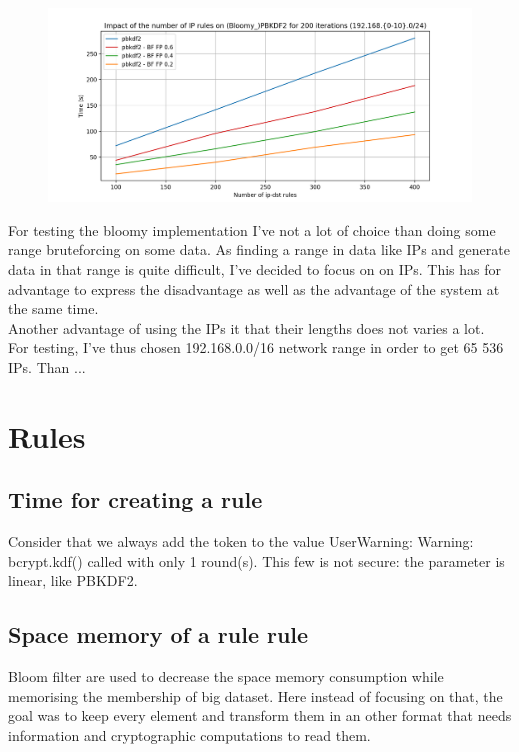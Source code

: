\documentclass{eplmastersthesis}
\begin{document}
\begin{figure}[h!]
\begin{center}
	\includegraphics[scale=0.3]{res/TimeIPs}
	\label{benchmarking:timeips}
\end{center}
\end{figure}



For testing the bloomy implementation I've not a lot of choice than doing some range bruteforcing on some data.
As finding a range in data like IPs and generate data in that range is quite difficult, I've decided to focus on on IPs. This has for advantage to express the disadvantage as well as the advantage of the system at the same time.\\
Another advantage of using the IPs it that their lengths does not varies a lot.\\

For testing, I've thus chosen 192.168.0.0/16 network range in order to get 65 536 IPs. Than ...

\section{Rules}

\subsection{Time for creating a rule}
Consider that we always add the token to the value
UserWarning: Warning: bcrypt.kdf() called with only 1 round(s). This few is not secure: the parameter is linear, like PBKDF2.
\subsection{Space memory of a rule rule}
Bloom filter are used to decrease the space memory consumption while memorising the membership of big dataset. Here instead of focusing on that, the goal was to keep every element and transform them in an other format that needs information and cryptographic computations to read them.\\
\end{document}
